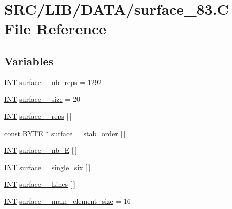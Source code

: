 \hypertarget{surface__83_8_c}{}\section{S\+R\+C/\+L\+I\+B/\+D\+A\+T\+A/surface\+\_\+83.C File Reference}
\label{surface__83_8_c}
\subsection*{Variables}
\begin{DoxyCompactItemize}
\item 
\mbox{\hyperlink{galois_8h_a09fddde158a3a20bd2dcadb609de11dc}{I\+NT}} \mbox{\hyperlink{surface__83_8_c_abc7dce8500bd90ab6a30911b37526d27}{surface\+\_\+\_\+nb\+\_\+reps}} = 1292
\item 
\mbox{\hyperlink{galois_8h_a09fddde158a3a20bd2dcadb609de11dc}{I\+NT}} \mbox{\hyperlink{surface__83_8_c_a223b2c2807e75c4d199173f0da9f988c}{surface\+\_\+\_\+size}} = 20
\item 
\mbox{\hyperlink{galois_8h_a09fddde158a3a20bd2dcadb609de11dc}{I\+NT}} \mbox{\hyperlink{surface__83_8_c_ac75794d3f0a398d5b47befa5814310f6}{surface\+\_\+\_\+reps}} \mbox{[}$\,$\mbox{]}
\item 
const \mbox{\hyperlink{galois_8h_ab6cc7b4aeb6ea31aba2b3fbfc83ff5e6}{B\+Y\+TE}} $\ast$ \mbox{\hyperlink{surface__83_8_c_ab62797941fb9833ede723d1531f92d26}{surface\+\_\+\_\+stab\+\_\+order}} \mbox{[}$\,$\mbox{]}
\item 
\mbox{\hyperlink{galois_8h_a09fddde158a3a20bd2dcadb609de11dc}{I\+NT}} \mbox{\hyperlink{surface__83_8_c_ae6fcb72dfc9846d0871a556ca685bca9}{surface\+\_\+\_\+nb\+\_\+E}} \mbox{[}$\,$\mbox{]}
\item 
\mbox{\hyperlink{galois_8h_a09fddde158a3a20bd2dcadb609de11dc}{I\+NT}} \mbox{\hyperlink{surface__83_8_c_a5eb077a24da2da990442857554b0e4ed}{surface\+\_\+\_\+single\+\_\+six}} \mbox{[}$\,$\mbox{]}
\item 
\mbox{\hyperlink{galois_8h_a09fddde158a3a20bd2dcadb609de11dc}{I\+NT}} \mbox{\hyperlink{surface__83_8_c_ac3bb7fbd63af62b9db5030242e2a9115}{surface\+\_\+\_\+\+Lines}} \mbox{[}$\,$\mbox{]}
\item 
\mbox{\hyperlink{galois_8h_a09fddde158a3a20bd2dcadb609de11dc}{I\+NT}} \mbox{\hyperlink{surface__83_8_c_a6b2eec9299637cf719ee9183c8e68370}{surface\+\_\+\_\+make\+\_\+element\+\_\+size}} = 16
\item 

\end{DoxyCompactItemize}
